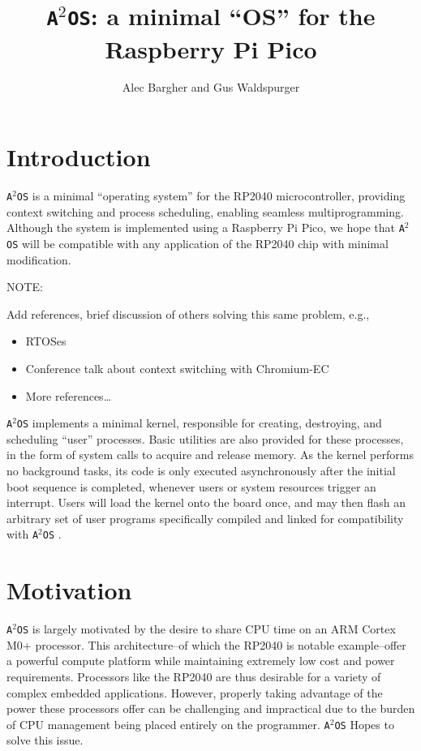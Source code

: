 \documentclass[12pt]{article}
\title{\texttt{A$^2$OS}: a minimal ``OS'' for the Raspberry Pi Pico}
\author{Alec Bargher and Gus Waldspurger}
\date{}
\newcommand{\os}{\texttt{A$^2$OS} }
\begin{document}
\maketitle

\section{Introduction}
\os is a minimal ``operating system'' for the RP2040 microcontroller, providing
context switching and process scheduling, enabling seamless multiprogramming.
Although the system is implemented using a Raspberry Pi Pico, we hope that \os
will be compatible with any application of the RP2040 chip with minimal
modification.

\begin{large} NOTE: \end{large}

Add references, brief discussion of others solving this same problem, e.g.,
\begin{itemize}
    \item RTOSes
    \item Conference talk about context switching with Chromium-EC
    \item More references\ldots
\end{itemize}
\vspace{1em}

\os implements a minimal kernel, responsible for creating, destroying, and
scheduling ``user'' processes. Basic utilities are also provided for these
processes, in the form of system calls to acquire and release memory. As the
kernel performs no background tasks, its code is only executed asynchronously
after the initial boot sequence is completed, whenever users or system resources
trigger an interrupt. Users will load the kernel onto the board once, and may
then flash an arbitrary set of user programs specifically compiled and linked
for compatibility with \os.

\section{Motivation}

\os is largely motivated by the desire to share CPU time on an ARM Cortex M0+
processor. This architecture--of which the RP2040 is notable example--offer a
powerful compute platform while maintaining extremely low cost and power
requirements. Processors like the RP2040 are thus desirable for a variety of
complex embedded applications. However, properly taking advantage of the
power these processors offer can be challenging and impractical due to the
burden of CPU management being placed entirely on the programmer. \os Hopes to
solve this issue.
\end{document}
